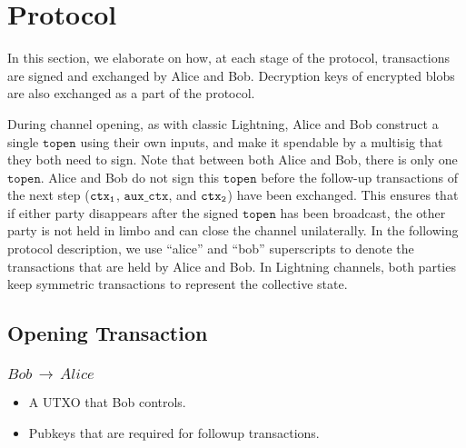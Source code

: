 \section{Protocol} \label{protocol}
In this section, we elaborate on how, at each stage of the protocol, transactions are signed and exchanged by Alice and Bob. Decryption keys of encrypted blobs are also exchanged as a part of the protocol.

During channel opening, as with classic Lightning, Alice and Bob construct a single $\texttt{topen}$ using their own inputs, and make it spendable by a multisig that they both need to sign. Note that between both Alice and Bob, there is only one $\texttt{topen}$. Alice and Bob do not sign this $\texttt{topen}$ before the follow-up transactions of the next step ($\texttt{ctx\textsubscript{1}}$, $\texttt{aux\_ctx}$, and $\texttt{ctx\textsubscript{2}}$) have been exchanged. This ensures that if either party disappears after the signed $\texttt{topen}$ has been broadcast, the other party is not held in limbo and can close the channel unilaterally. In the following protocol description, we use ``alice'' and ``bob'' superscripts to denote the transactions that are held by Alice and Bob. In Lightning channels, both parties keep symmetric transactions to represent the collective state. 

\subsection{Opening Transaction}
\subsubsection{$Bob\,\to\,Alice$}
\begin{itemize}[leftmargin=4\parindent]
    \item A UTXO that Bob controls.
    \item Pubkeys that are required for followup transactions.
\end{itemize}
